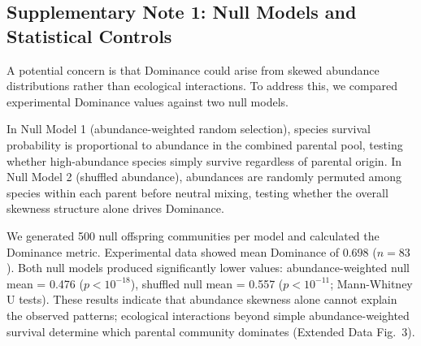 
\subsection*{Supplementary Note 1: Null Models and Statistical Controls}
\label{sec:suppl:note1}

A potential concern is that Dominance could arise from skewed abundance distributions rather than ecological interactions. To address this, we compared experimental Dominance values against two null models.

In Null Model 1 (abundance-weighted random selection), species survival probability is proportional to abundance in the combined parental pool, testing whether high-abundance species simply survive regardless of parental origin. In Null Model 2 (shuffled abundance), abundances are randomly permuted among species within each parent before neutral mixing, testing whether the overall skewness structure alone drives Dominance.

We generated 500 null offspring communities per model and calculated the Dominance metric. Experimental data showed mean Dominance of 0.698 ($n = 83$). Both null models produced significantly lower values: abundance-weighted null mean = 0.476 ($p < 10^{-18}$), shuffled null mean = 0.557 ($p < 10^{-11}$; Mann-Whitney U tests). These results indicate that abundance skewness alone cannot explain the observed patterns; ecological interactions beyond simple abundance-weighted survival determine which parental community dominates (Extended Data Fig.~3).

